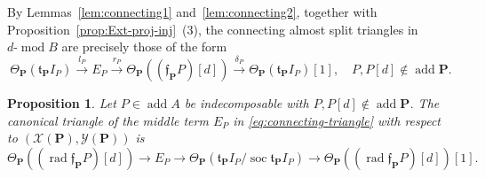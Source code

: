 \documentclass[11pt,a4paper,reqno]{amsart}
\theoremstyle{plain}
\newtheorem{proposition}[theorem]{Proposition}
\numberwithin{equation}{section}
\theoremstyle{definition}
\providecommand{\add}{\operatorname{add}}
\renewcommand{\mod}{\operatorname{mod}}
\newcommand{\emod}[2]{#1\text{-}\!\mod #2}
\newcommand{\PP}{\mathbf{P}}
\newcommand{\X}{\mathcal{X}}
\newcommand{\Y}{\mathcal{Y}}
\begin{document}
By Lemmas~\ref{lem:connecting1} and~\ref{lem:connecting2}, together with Proposition~\ref{prop:Ext-proj-inj}~(3), the connecting almost split triangles in $\emod{d}{B}$ are precisely those of the form
\begin{equation}\label{eq:connecting-triangle}
 \Theta_{\PP}(\mathfrak{t}_{\PP}I_P)\xrightarrow{l_P}E_P\xrightarrow{r_P}\Theta_{\PP}((\mathfrak{f}_{\PP}P)[d])
 \xrightarrow{\delta_P}\Theta_{\PP}(\mathfrak{t}_{\PP}I_P)[1],
 \quad P,P[d]\notin\add\PP.
\end{equation}

\begin{proposition}\label{prop:connecting}
Let $P\in\add A$ be indecomposable with
$P,P[d]\notin\add\PP$.
The canonical triangle of the middle term $E_P$ in
\eqref{eq:connecting-triangle} with respect to $(\X(\PP),\Y(\PP))$ is
\[
 \Theta_{\PP}((\operatorname{rad}\mathfrak{f}_{\PP}P)[d])\to E_P \to \Theta_{\PP}(\mathfrak{t}_{\PP}I_P/\operatorname{soc}\mathfrak{t}_{\PP}I_P) \to\Theta_{\PP}((\operatorname{rad}\mathfrak{f}_{\PP}P)[d])[1].
\]
\end{proposition}
\end{document}
